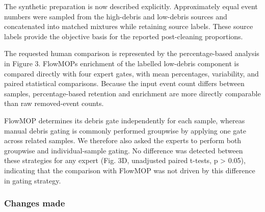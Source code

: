 \documentclass[
  11pt,
  a4paper,
]{article}
\begin{document}
The synthetic preparation is now described explicitly. Approximately
equal event numbers were sampled from the high-debris and low-debris
sources and concatenated into matched mixtures while retaining source
labels. These source labels provide the objective basis for the reported
post-cleaning proportions.

The requested human comparison is represented by the percentage-based
analysis in Figure 3. FlowMOP\textquotesingle s enrichment of the
labelled low-debris component is compared directly with four expert
gates, with mean percentages, variability, and paired statistical
comparisons. Because the input event count differs between samples,
percentage-based retention and enrichment are more directly comparable
than raw removed-event counts.

FlowMOP determines its debris gate independently for each sample,
whereas manual debris gating is commonly performed groupwise by applying
one gate across related samples. We therefore also asked the experts to
perform both groupwise and individual-sample gating. No difference was
detected between these strategies for any expert (Fig. 3D, unadjusted
paired t-tests, p \textgreater{} 0.05), indicating that the comparison
with FlowMOP was not driven by this difference in gating strategy.

\subsubsection{Changes made}\label{changes-made-9}
\end{document}
